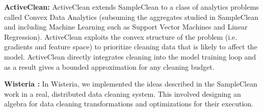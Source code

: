 \vspace{0.5em}
\noindent \textbf{ActiveClean: } ActiveClean extends SampleClean to a class of analytics problems called Convex Data Analytics (subsuming the aggregates studied in SampleClean and including Machine Learning such as Support Vector Machines and Linear Regression). ActiveClean exploits the convex structure of the problem (i.e. gradients and feature space) to prioritize cleaning data that is likely to affect the model. ActiveClean directly integrates cleaning into the model training loop and as a result gives a bounded approximation for any cleaning budget.

\vspace{0.5em}
\noindent \textbf{Wisteria \cite{haas2015wisteria}: } In Wisteria, we implemented the ideas described in the SampleClean work in a real, distributed data cleaning system. This involved designing an algebra for data cleaning transformations and optimizations for their execution.
